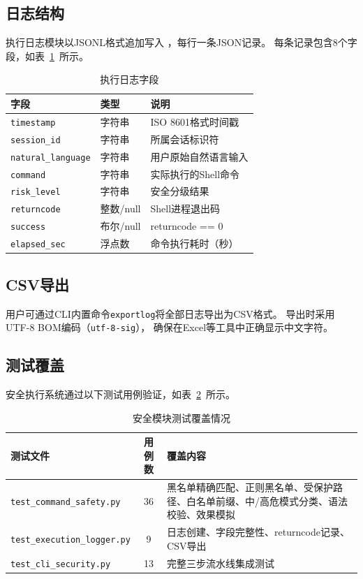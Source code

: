 \subsection{日志结构}

执行日志模块以JSONL格式追加写入
，每行一条JSON记录。
每条记录包含8个字段，如表~\ref{tab:log-fields}~所示。

\begin{table}[H]
\centering
\caption{执行日志字段}
\label{tab:log-fields}
\begin{tabular}{lll}
\toprule
字段 & 类型 & 说明 \\
\midrule
\texttt{timestamp} & 字符串 & ISO 8601格式时间戳 \\
\texttt{session\_id} & 字符串 & 所属会话标识符 \\
\texttt{natural\_language} & 字符串 & 用户原始自然语言输入 \\
\texttt{command} & 字符串 & 实际执行的Shell命令 \\
\texttt{risk\_level} & 字符串 & 安全分级结果 \\
\texttt{returncode} & 整数/null & Shell进程退出码 \\
\texttt{success} & 布尔/null & returncode == 0 \\
\texttt{elapsed\_sec} & 浮点数 & 命令执行耗时（秒） \\
\bottomrule
\end{tabular}
\end{table}

\subsection{CSV导出}

用户可通过CLI内置命令\texttt{exportlog}将全部日志导出为CSV格式。
导出时采用UTF-8 BOM编码（\texttt{utf-8-sig}），
确保在Excel等工具中正确显示中文字符。

\subsection{测试覆盖}

安全执行系统通过以下测试用例验证，如表~\ref{tab:safety-tests}~所示。

\begin{table}[htbp]
\centering
\caption{安全模块测试覆盖情况}
\label{tab:safety-tests}
\begin{tabular}{lcp{6cm}}
\toprule
测试文件 & 用例数 & 覆盖内容 \\
\midrule
\texttt{test\_command\_safety.py} & 36 & 黑名单精确匹配、正则黑名单、受保护路径、白名单前缀、中/高危模式分类、语法校验、效果模拟 \\
\texttt{test\_execution\_logger.py} & 9 & 日志创建、字段完整性、returncode记录、CSV导出 \\
\texttt{test\_cli\_security.py} & 13 & 完整三步流水线集成测试 \\
\bottomrule
\end{tabular}
\end{table}

